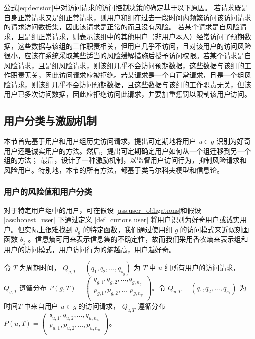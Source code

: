 公式\ref{eq:decision}中对访问请求的访问控制决策的确定基于以下原因。 若请求既是自身正常请求又是组正常请求，则用户和组在过去一段时间内频繁访问该访问请求的请求访问数据集，因此该请求是正常的而且没有风险。 若某个请求是自风险请求，且是组正常请求，则表示该组中的其他用户（非用户本人）经常访问了预期数据，这些数据与该组的工作职责相关，但用户几乎不访问，且对该用户的访问风险很小，应该在系统采取某些适当的风险缓解措施后授予访问权限。若某个请求是自风险请求，且是组风险请求，则该组几乎不会访问预期数据，这些数据与该组的工作职责无关，因此访问请求应被拒绝。若某请求是一个自正常请求，且是一个组风险请求，则该组几乎不会访问预期数据，且这些数据与该组的工作职责无关，但该用户已多次访问数据，因此应拒绝访问此请求，并要加重惩罚以限制该用户访问。


\subsection{用户分类与激励机制}
\label{subsec:User classification and incentive mechanism}
本节首先基于用户和用户组历史访问请求，提出可定期地将用户 $u \in g$ 识别为好奇用户还是诚实用户的方法。然后，提出可定期确定用户如何从一个组迁移到另一个组的方法； 最后，设计了一种激励机制，以监督用户访问行为，抑制风险请求和风险用户。特别地，本节的所有方法，都基于类马尔科夫模型和信息论。

\subsubsection{用户的风险值和用户分类}
对于特定用户组中的用户，可在假设 \ref{ass:user_obligations}和假设 \ref{ass:honest_user} 下通过定义 \ref{def_curious user} 将用户识别为好奇用户或诚实用户。但实际上很难找到 $\theta_g$ 的特定函数，我们通过使用组 $g$ 的访问模式来近似刻画函数 $\theta_g$ 。信息熵可用来表示信息集的不确定性，故而我们采用香农熵来表示组和用户的访问模式，用户访问行为的熵越高，用户越好奇。

令 $T$ 为周期时间， $Q_{g,T}=(q_1, q_2,...,q_{s_g})$ 为 $T$ 中 $u$ 组所有用户的访问请求， $Q_{g,T}$ 遵循分布
$P(g,T)=
(
\begin{array}{l}
q_{g,1},  q_{g,2}, ...,q_{g,n_g}\\
p_{g,1},  p_{g,2}, ...,p_{g,n_g}\\
\end{array}
)
$。令 $Q_{u,T}=(q_1, q_2,...,q_{s_u})$ 为 时间$T$ 中来自用户 $u \in g$ 的访问请求， $Q_{u,T}$ 遵循分布
$P(u,T)=
(
\begin{array}{l}
q_{u,1},  q_{u,2}, ...,q_{u,n_u}\\
p_{u,1},  p_{u,2}, ...,p_{u,n_u}\\
\end{array}
)
$。

